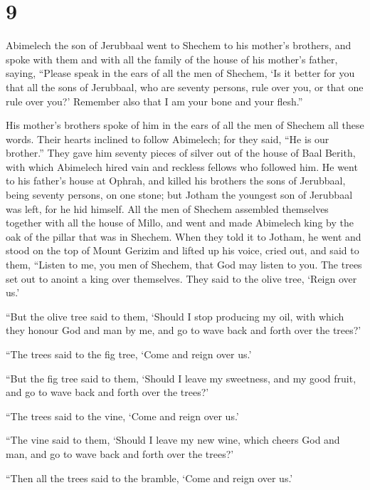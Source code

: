 \hypertarget{section-8}{%
\section{9}\label{section-8}}

 Abimelech the son of Jerubbaal went to Shechem to his
mother's brothers, and spoke with them and with all the family of the
house of his mother's father, saying,  ``Please speak in the
ears of all the men of Shechem, `Is it better for you that all the sons
of Jerubbaal, who are seventy persons, rule over you, or that one rule
over you?' Remember also that I am your bone and your flesh.''

 His mother's brothers spoke of him in the ears of all the
men of Shechem all these words. Their hearts inclined to follow
Abimelech; for they said, ``He is our brother.''  They gave
him seventy pieces of silver out of the house of Baal Berith, with which
Abimelech hired vain and reckless fellows who followed him. 
He went to his father's house at Ophrah, and killed his brothers the
sons of Jerubbaal, being seventy persons, on one stone; but Jotham the
youngest son of Jerubbaal was left, for he hid himself.  All
the men of Shechem assembled themselves together with all the house of
Millo, and went and made Abimelech king by the oak of the pillar that
was in Shechem.  When they told it to Jotham, he went and
stood on the top of Mount Gerizim and lifted up his voice, cried out,
and said to them, ``Listen to me, you men of Shechem, that God may
listen to you.  The trees set out to anoint a king over
themselves. They said to the olive tree, `Reign over us.'

 ``But the olive tree said to them, `Should I stop producing
my oil, with which they honour God and man by me, and go to wave back
and forth over the trees?'

 ``The trees said to the fig tree, `Come and reign over
us.'

 ``But the fig tree said to them, `Should I leave my
sweetness, and my good fruit, and go to wave back and forth over the
trees?'

 ``The trees said to the vine, `Come and reign over us.'

 ``The vine said to them, `Should I leave my new wine,
which cheers God and man, and go to wave back and forth over the trees?'

 ``Then all the trees said to the bramble, `Come and reign
over us.'


